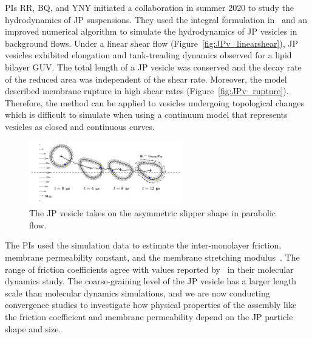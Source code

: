 %




PIs RR, BQ, and YNY initiated a collaboration in summer 2020 to study
the hydrodynamics of JP suspensions. They used the integral formulation
in~\cite{Fu2018_SIAM} and an improved numerical algorithm to simulate
the hydrodynamics of JP vesicles in background flows. Under a linear
shear flow (Figure~\ref{fig:JPv_linearshear}), JP vesicles exhibited
elongation and tank-treading dynamics observed for a lipid bilayer GUV.
The total length of a JP vesicle was conserved and the decay rate of the
reduced area was independent of the shear rate.  Moreover, the model
described membrane rupture in high shear rates
(Figure~\ref{fig:JPv_rupture}). Therefore, the method can be applied to
vesicles undergoing topological changes which is difficult to simulate
when using a continuum model that represents vesicles as closed and
continuous curves.

\begin{figure}
\includegraphics[width=0.6\textwidth]{figures/Slipper.jpg}
\caption{\label{fig:JP_poiseuille}The JP vesicle takes on the asymmetric
  slipper shape in parabolic flow.}
\end{figure}
The PIs used the simulation data to estimate the inter-monolayer
friction, membrane permeability constant, and the membrane
stretching modulus~\cite{chabanon2017, sch_vla_mik2010}. The range
of friction coefficients agree with values reported
by~\cite{denOtter2007,WuoEd06} in their molecular dynamics study. The
coarse-graining level of the JP vesicle has a larger length scale than
molecular dynamics simulations, and we are now conducting convergence
studies to investigate how physical properties of the assembly like the
friction coefficient and membrane permeability depend on the JP particle
shape and size.

